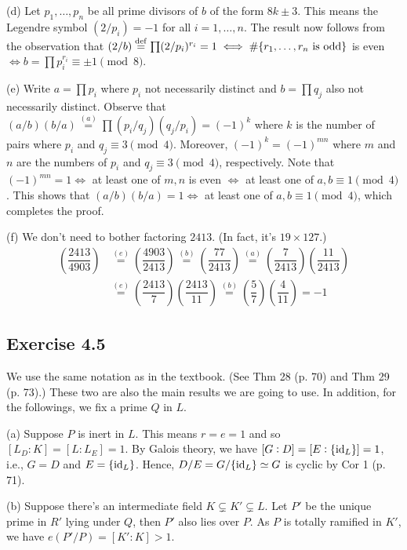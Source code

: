 \documentclass[../Marcus.tex]{subfiles}
\begin{document}
(d) Let $p_1,\ldots,p_n$ be all prime divisors of $b$ of the form $8k\pm3$. This means the Legendre symbol $(2/p_i)=-1$ for all $i=1,\ldots,n$. The result now follows from the observation that $(2/b)\overset{\operatorname{def}}{=}\prod (2/p_i)^{r_i}=1 \iff \#\{r_1,\ldots,r_n \text{ is odd}\}$ is even $\iff b=\prod p_i^{r_i}\equiv \pm1\pmod{8}$.

(e) Write $a=\prod p_i$ where $p_i$ not necessarily distinct and $b=\prod q_j$ also not necessarily distinct. Observe that $(a/b)(b/a)\overset{(a)}{=}\prod (p_i/q_j)(q_j/p_i)=(-1)^k$ where $k$ is the number of pairs where $p_i$ and $q_j\equiv 3\pmod{4}$. Moreover, $(-1)^k=(-1)^{mn}$ where $m$ and $n$ are the numbers of $p_i$ and $q_j\equiv 3\pmod{4}$, respectively. Note that $(-1)^{mn}=1 \iff$ at least one of $m,n$ is even $\iff$ at least one of $a,b\equiv 1\pmod{4}$. This shows that $(a/b)(b/a)=1 \iff$ at least one of $a,b\equiv 1\pmod{4}$, which completes the proof.

(f) We don't need to bother factoring $2413$. (In fact, it's $19\times 127$.)
\begin{align*}
\left(\dfrac{2413}{4903}\right) &\overset{(e)}{=} \left(\dfrac{4903}{2413}\right) \overset{(b)}{=} \left(\dfrac{77}{2413}\right) \overset{(a)}{=} \left(\dfrac{7}{2413}\right)\left(\dfrac{11}{2413}\right) \\ &\overset{(e)}{=} \left(\dfrac{2413}{7}\right)\left(\dfrac{2413}{11}\right) \overset{(b)}{=} \left(\dfrac{5}{7}\right)\left(\dfrac{4}{11}\right) = -1
\end{align*}


\subsection*{Exercise 4.5}

We use the same notation as in the textbook. (See Thm 28 (p. 70) and Thm 29 (p. 73).) These two are also the main results we are going to use. In addition, for the followings, we fix a prime $Q$ in $L$.

(a) Suppose $P$ is inert in $L$. This means $r=e=1$ and so $[L_D:K]=[L:L_E]=1$. By Galois theory, we have $[G:D]=[E:\{\operatorname{id}_L\}]=1$, i.e., $G=D$ and $E=\{\operatorname{id}_L\}$. Hence, $D/E=G/\{\operatorname{id}_L\}\simeq G$ is cyclic by Cor 1 (p. 71).

(b) Suppose there's an intermediate field $K\varsubsetneq K'\varsubsetneq L$. Let $P'$ be the unique prime in $R'$ lying under $Q$, then $P'$ also lies over $P$. As $P$ is totally ramified in $K'$, we have $e(P'/P)=[K':K]>1$.
\end{document}
